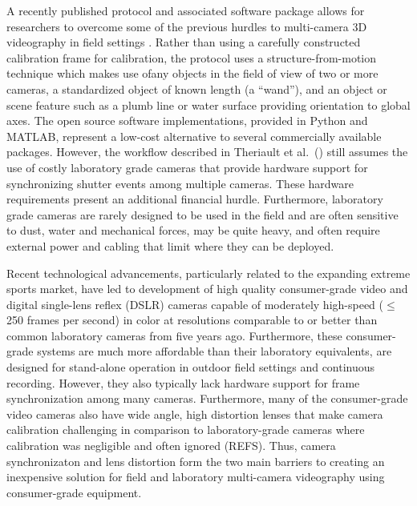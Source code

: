 \documentclass[fleqn,10pt]{wlpeerj}
\begin{document}
A recently published protocol and associated software package allows for researchers to overcome some of the previous hurdles to multi-camera 3D videography in field settings \citep{Theriault:2014}.  Rather than using a carefully constructed calibration frame for calibration, the protocol uses a structure-from-motion technique which makes use ofany objects in the field of view of two or more cameras, a standardized object of known length (a “wand”), and an object or scene feature such as a plumb line or water surface providing orientation to global axes.  The open source software implementations, provided in Python and MATLAB, represent a low-cost alternative to several commercially available packages.  However, the workflow described in Theriault et al.~(\citeyear{Theriault:2014}) still assumes the use of costly laboratory grade cameras that provide hardware support for synchronizing shutter events among multiple cameras. These hardware requirements present an additional financial hurdle. Furthermore, laboratory grade cameras are rarely designed to be used in the field and are often sensitive to dust, water and mechanical forces, may be quite heavy, and often require external power and cabling that limit where they can be deployed.

Recent technological advancements, particularly related to the expanding extreme sports market, have led to development of high quality consumer-grade video and digital single-lens reflex (DSLR) cameras capable of moderately high-speed ($\le$250 frames per second) in color at resolutions comparable to or better than common laboratory cameras from five years ago. Furthermore, these consumer-grade systems are much more affordable than their laboratory equivalents, are designed for stand-alone operation in outdoor field settings and continuous recording. However, they also typically lack hardware support for frame synchronization among many cameras.  Furthermore, many of the consumer-grade video cameras also have wide angle, high distortion lenses that make camera calibration challenging in comparison to laboratory-grade cameras where calibration was negligible and often ignored (REFS). Thus, camera synchronizaton and lens distortion form the two main barriers to creating an inexpensive solution for field and laboratory multi-camera videography using consumer-grade equipment.
\end{document}
